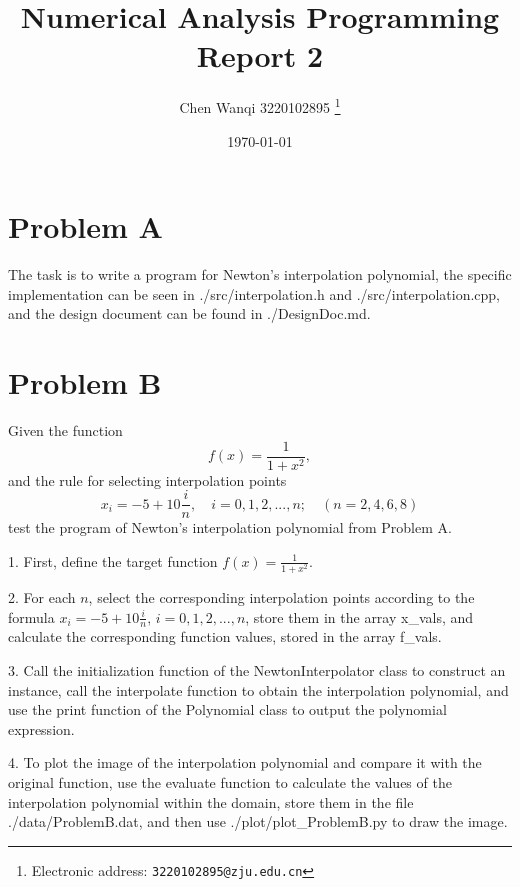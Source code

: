 \documentclass[a4paper]{article}
\begin{document}
\title{Numerical Analysis Programming Report 2}

\author{Chen Wanqi 3220102895
  \thanks{Electronic address: \texttt{3220102895@zju.edu.cn}}}

\date{\today}

\maketitle


\section*{Problem A}
The task is to write a program for Newton's interpolation polynomial, the specific implementation can be seen in ./src/interpolation.h and ./src/interpolation.cpp, and the design document can be found in ./DesignDoc.md.

\section*{Problem B}

Given the function
\[
    f(x) = \frac{1}{1+x^2},
\]
and the rule for selecting interpolation points
\[
    x_i = -5 + 10\frac{i}{n}, \quad i = 0,1,2,...,n; \quad (n = 2,4,6,8)
\]
test the program of Newton's interpolation polynomial from Problem A.

1. First, define the target function \( f(x) = \frac{1}{1 + x^2} \).

2. For each \( n \), select the corresponding interpolation points according to the formula \( x_i = -5 + 10\frac{i}{n}, \, i = 0,1,2,...,n \), store them in the array x\_vals, and calculate the corresponding function values, stored in the array f\_vals.

3. Call the initialization function of the NewtonInterpolator class to construct an instance, call the interpolate function to obtain the interpolation polynomial, and use the print function of the Polynomial class to output the polynomial expression.

4. To plot the image of the interpolation polynomial and compare it with the original function, use the evaluate function to calculate the values of the interpolation polynomial within the domain, store them in the file ./data/ProblemB.dat, and then use ./plot/plot\_ProblemB.py to draw the image.
\end{document}
